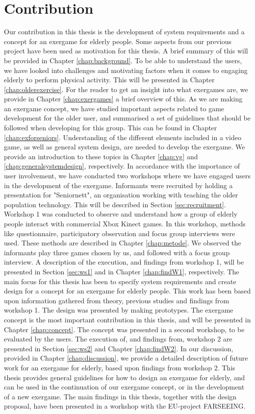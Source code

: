 \section{Contribution}
Our contribution in this thesis is the development of system requirements and a concept for an exergame for elderly people. Some aspects from our previous project \cite{project} have been used as motivation for this thesis. A brief summary of this will be provided in Chapter \ref{chap:background}. To be able to understand the users, we have looked into challenges and motivating factors when it comes to engaging elderly to perform physical activity. This will be presented in Chapter \ref{chap:olderexercise}. For the reader to get an insight into what exergames are, we provide in Chapter \ref{chap:exergames} a brief overview of this. As we are making an exergame concept, we have studied important aspects related to game development for the older user, and summarised a set of guidelines that should be followed when developing for this group. This can be found in Chapter \ref{chap:exforseniors}. Understanding of the different elements included in a video game, as well as general system design, are needed to develop the exergame. We provide an introduction to these topics in Chapter \ref{chap:vg} and \ref{chap:generalsystemdesign}, respectively. In accordance with the importance of user involvement, we have conducted two workshops where we have engaged users in the development of the exergame. Informants were recruited by holding a presentation for "Seniornett", an organisation working with teaching the older population technology. This will be described in Section \ref{sec:recruitment}. Workshop 1 was conducted to observe and understand how a group of elderly people interact with commercial Xbox Kinect games. In this workshop, methods like questionnaire, participatory observation and focus group interviews were used. These methods are described in Chapter \ref{chap:metode}. We observed the informants play three games chosen by us, and followed with a focus group interview. A description of the execution, and findings from workshop 1, will be presented in Section \ref{sec:ws1} and in Chapter \ref{chap:findW1}, respectively. The main focus for this thesis has been to specify system requirements and create design for a concept for an exergame for elderly people. This work has been based upon information gathered from theory, previous studies and findings from workshop 1. The design was presented by making prototypes. The exergame concept is the most important contribution in this thesis, and will be presented in Chapter \ref{chap:concept}. The concept was presented in a second workshop, to be evaluated by the users. The execution of, and findings from, workshop 2 are presented in Section \ref{sec:ws2} and Chapter \ref{chap:findW2}. In our discussion, provided in Chapter \ref{chap:discussion}, we provide a detailed description of future work for an exergame for elderly, based upon findings from workshop 2. This thesis provides general guidelines for how to design an exergame for elderly, and can be used in the continuation of our exergame concept, or in the development of a new exergame. The main findings in this thesis, together with the design proposal, have been presented in a workshop with the EU-project FARSEEING.     

